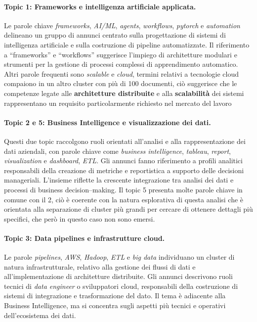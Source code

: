 \paragraph{Topic 1: Frameworks e intelligenza artificiale applicata.}
Le parole chiave \emph{frameworks}, \emph{AI/ML}, \emph{agents}, \emph{workflows},
\emph{pytorch} e \emph{automation} delineano un gruppo di annunci centrato sulla progettazione
di sistemi di intelligenza artificiale e sulla costruzione di pipeline automatizzate.
Il riferimento a ``frameworks'' e ``workflows'' suggerisce l’impiego di architetture modulari
e strumenti per la gestione di processi complessi di apprendimento automatico.
Altri parole frequenti sono \emph{scalable} e \emph{cloud}, termini relativi a tecnologie cloud compaiono in un altro cluster con più di 100 documenti, ciò suggerisce che le competenze legate alle \textbf{architetture distribuite} e alla \textbf{scalabilità} dei sistemi rappresentano un requisito particolarmente richiesto nel mercato del lavoro

\paragraph{Topic 2 e 5: Business Intelligence e visualizzazione dei dati.}
Questi due topic raccolgono ruoli orientati all’analisi e alla rappresentazione
dei dati aziendali, con parole chiave come \emph{business intelligence},
\emph{tableau}, \emph{report}, \emph{visualization} e \emph{dashboard}, \emph{ETL}.
Gli annunci fanno riferimento a profili analitici responsabili della creazione
di metriche e reportistica a supporto delle decisioni manageriali.
L’insieme riflette la crescente integrazione tra analisi dei dati e processi di
business decision–making.
Il topic 5 presenta molte parole chiave in comune con il 2, ciò è coerente con la natura esplorativa di questa analisi che è orientata alla separazione di cluster più grandi per cercare di ottenere dettagli più specifici, che però in questo caso non sono emersi.

\paragraph{Topic 3: Data pipelines e infrastrutture cloud.}
Le parole \emph{pipelines}, \emph{AWS}, \emph{Hadoop}, \emph{ETL} e \emph{big data}
individuano un cluster di natura infrastrutturale, relativo alla gestione
dei flussi di dati e all’implementazione di architetture distribuite.
Gli annunci descrivono ruoli tecnici di \emph{data engineer} o sviluppatori cloud,
responsabili della costruzione di sistemi di integrazione e trasformazione del dato.
Il tema è adiacente alla Business Intelligence, ma si concentra sugli aspetti
più tecnici e operativi dell’ecosistema dei dati.


